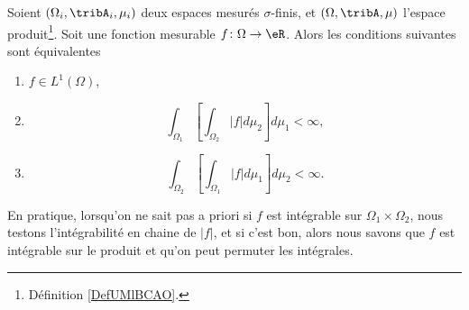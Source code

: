 \begin{corollary}\label{CorTKZKwP}
    Soient \( (\Omega_i,\tribA_i,\mu_i)\) deux espaces mesurés \( \sigma\)-finis, et \( (\Omega,\tribA,\mu)\) l'espace produit\footnote{Définition \ref{DefUMlBCAO}.}. Soit une fonction mesurable \( f\colon \Omega\to \eR\). Alors les conditions suivantes sont équivalentes
    \begin{enumerate}
        \item
            \( f\in L^1(\Omega)\),
        \item
            \begin{equation}
                \int_{\Omega_1}\left[ \int_{\Omega_2}| f |d\mu_2 \right]d\mu_1 <\infty,
            \end{equation}
        \item
            \begin{equation}
                \int_{\Omega_2}\left[ \int_{\Omega_1}| f |d\mu_1 \right]d\mu_2 <\infty.
            \end{equation}
    \end{enumerate}
\end{corollary}
En pratique, lorsqu'on ne sait pas a priori si \( f\) est intégrable sur \( \Omega_1\times \Omega_2\), nous testons l'intégrabilité en chaine de \( | f |\), et si c'est bon, alors nous savons que \( f\) est intégrable sur le produit et qu'on peut permuter les intégrales.

